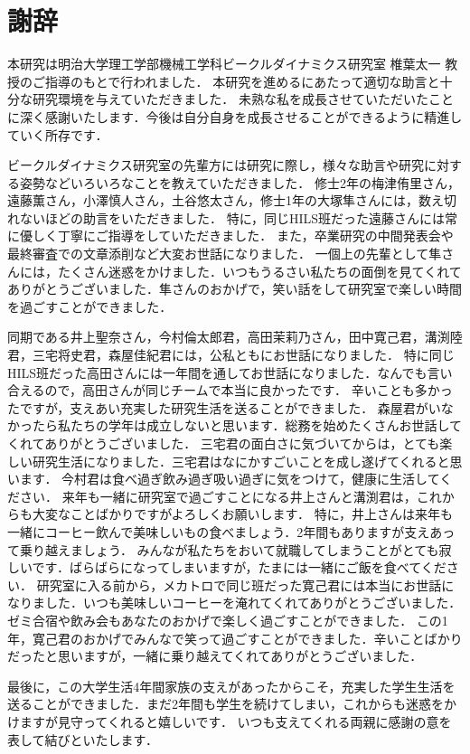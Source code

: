 \documentclass[a4paper,12pt]{article_vdlab_sotsuron}
\begin{document}
\newpage
\section*{謝辞}
本研究は明治大学理工学部機械工学科ビークルダイナミクス研究室 椎葉太一 教授のご指導のもとで行われました．
本研究を進めるにあたって適切な助言と十分な研究環境を与えていただきました．
未熟な私を成長させていただいたことに深く感謝いたします．今後は自分自身を成長させることができるように精進していく所存です．

ビークルダイナミクス研究室の先輩方には研究に際し，様々な助言や研究に対する姿勢などいろいろなことを教えていただきました．
修士2年の梅津侑里さん，遠藤薫さん，小澤慎人さん，土谷悠太さん，修士1年の大塚隼さんには，数え切れないほどの助言をいただきました．
特に，同じHILS班だった遠藤さんには常に優しく丁寧にご指導をしていただきました．
また，卒業研究の中間発表会や最終審査での文章添削など大変お世話になりました．
一個上の先輩として隼さんには，たくさん迷惑をかけました．いつもうるさい私たちの面倒を見てくれてありがとうございました．隼さんのおかげで，笑い話をして研究室で楽しい時間を過ごすことができました．

同期である井上聖奈さん，今村倫太郎君，高田茉莉乃さん，田中寛己君，溝渕陸君，三宅将史君，森屋佳紀君には，公私ともにお世話になりました．
特に同じHILS班だった高田さんには一年間を通してお世話になりました．なんでも言い合えるので，高田さんが同じチームで本当に良かったです．
辛いことも多かったですが，支えあい充実した研究生活を送ることができました．
森屋君がいなかったら私たちの学年は成立しないと思います．総務を始めたくさんお世話してくれてありがとうございました．
三宅君の面白さに気づいてからは，とても楽しい研究生活になりました．三宅君はなにかすごいことを成し遂げてくれると思います．
今村君は食べ過ぎ飲み過ぎ吸い過ぎに気をつけて，健康に生活してください．
来年も一緒に研究室で過ごすことになる井上さんと溝渕君は，これからも大変なことばかりですがよろしくお願いします．
特に，井上さんは来年も一緒にコーヒー飲んで美味しいもの食べましょう．2年間もありますが支えあって乗り越えましょう．
みんなが私たちをおいて就職してしまうことがとても寂しいです．ばらばらになってしまいますが，たまには一緒にご飯を食べてください．
研究室に入る前から，メカトロで同じ班だった寛己君には本当にお世話になりました．いつも美味しいコーヒーを淹れてくれてありがとうございました．
ゼミ合宿や飲み会もあなたのおかげで楽しく過ごすことができました．
この1年，寛己君のおかげでみんなで笑って過ごすことができました．辛いことばかりだったと思いますが，一緒に乗り越えてくれてありがとうございました．

最後に，この大学生活4年間家族の支えがあったからこそ，充実した学生生活を送ることができました．まだ2年間も学生を続けてしまい，これからも迷惑をかけますが見守ってくれると嬉しいです．
いつも支えてくれる両親に感謝の意を表して結びといたします．
\end{document}
